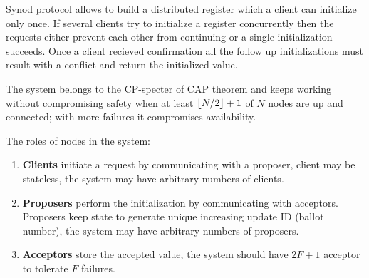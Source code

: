 \documentclass[12pt]{article}
\DeclarePairedDelimiter{\floor}{\lfloor}{\rfloor}
\begin{document}
Synod protocol allows to build a distributed register which a client can initialize only once. If several clients try to initialize a register concurrently then the requests either prevent each other from continuing or a single initialization succeeds. Once a client recieved confirmation all the follow up initializations must result with a conflict and return the initialized value.

The system belongs to the CP-specter of CAP theorem and keeps working without compromising safety when at least $\floor{N/2} + 1$ of $N$ nodes are up and connected; with more failures it compromises availability.

The roles of nodes in the system:
\begin{enumerate}
  \item {\bf Clients} initiate a request by communicating with a proposer, client may be stateless, the system may have arbitrary numbers of clients.
  \item {\bf Proposers} perform the initialization by communicating with acceptors. Proposers keep state to generate unique increasing update ID (ballot number), the system may have arbitrary numbers of proposers.
  \item {\bf Acceptors} store the accepted value, the system should have $2F+1$ acceptor to tolerate $F$ failures.
\end{enumerate}

\begin{figure}[!h]
  \centering
\end{figure}
\end{document}
